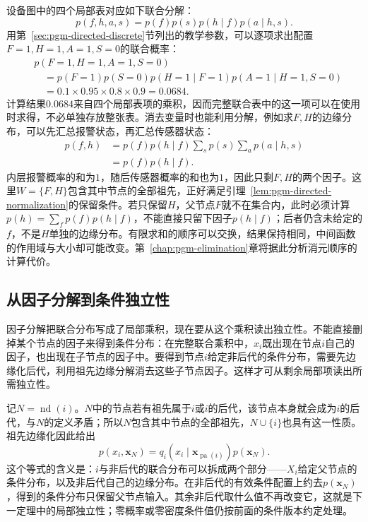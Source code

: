 设备图中的四个局部表对应如下联合分解：
\begin{equation}
  p(f,h,a,s)=p(f)p(s)p(h\mid f)p(a\mid h,s).
  \label{eq:pgm-directed-device-factor}
\end{equation}
用第~\ref{sec:pgm-directed-discrete}节列出的教学参数，可以逐项求出配置$F=1,H=1,A=1,S=0$的联合概率：
\begin{equation}
  \begin{aligned}
    &p(F=1,H=1,A=1,S=0)\\
    &\quad=p(F=1)p(S=0)p(H=1\mid F=1)
      p(A=1\mid H=1,S=0)\\
    &\quad=0.1\times0.95\times0.8\times0.9
      =0.0684.
  \end{aligned}
  \label{eq:pgm-directed-device-configuration}
\end{equation}
计算结果$0.0684$来自四个局部表项的乘积，因而完整联合表中的这一项可以在使用时求得，不必单独存放整张表。消去变量时也能利用分解，例如求$F,H$的边缘分布，可以先汇总报警状态，再汇总传感器状态：
\[
  \begin{aligned}
    p(f,h)
    &=p(f)p(h\mid f)
      \sum_s p(s)\sum_a p(a\mid h,s)\\
    &=p(f)p(h\mid f).
  \end{aligned}
\]
内层报警概率的和为$1$，随后传感器概率的和也为$1$，因此只剩$F,H$的两个因子。这里$W=\{F,H\}$包含其中节点的全部祖先，正好满足引理~\ref{lem:pgm-directed-normalization}的保留条件。若只保留$H$，父节点$F$就不在集合内，此时必须计算$p(h)=\sum_f p(f)p(h\mid f)$，不能直接只留下因子$p(h\mid f)$；后者仍含未给定的$f$，不是$H$单独的边缘分布。有限求和的顺序可以交换，结果保持相同，中间函数的作用域与大小却可能改变。第~\ref{chap:pgm-elimination}章将据此分析消元顺序的计算代价。

\subsection{从因子分解到条件独立性}
\label{sec:pgm-directed-factor-to-ci}

因子分解把联合分布写成了局部乘积，现在要从这个乘积读出独立性。不能直接删掉某个节点的因子来得到条件分布：在完整联合乘积中，$x_i$既出现在节点$i$自己的因子，也出现在子节点的因子中。要得到节点$i$给定非后代的条件分布，需要先边缘化后代，利用祖先边缘分解消去这些子节点因子。这样才可从剩余局部项读出所需独立性。

记$N=\operatorname{nd}(i)$。$N$中的节点若有祖先属于$i$或$i$的后代，该节点本身就会成为$i$的后代，与$N$的定义矛盾；所以$N$包含其中节点的全部祖先，$N\cup\{i\}$也具有这一性质。祖先边缘化因此给出
\[
  p(x_i,\bm x_N)
    =q_i(x_i\mid\bm x_{\operatorname{pa}(i)})p(\bm x_N).
\]
这个等式的含义是：$i$与非后代的联合分布可以拆成两个部分——$X_i$给定父节点的条件分布，以及非后代自己的边缘分布。在非后代的有效条件配置上约去$p(\bm x_N)$，得到的条件分布只保留父节点输入。其余非后代取什么值不再改变它，这就是下一定理中的局部独立性；零概率或零密度条件值仍按前面的条件版本约定处理。

